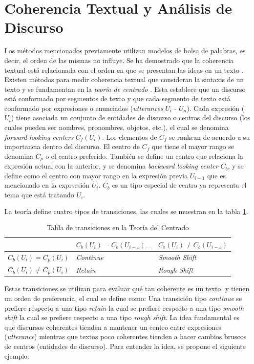 \documentclass[12pt]{diicc}
\begin{document}
\section{Coherencia Textual y Análisis de Discurso}
Los métodos mencionados previamente utilizan modelos de bolsa de palabras, es decir, el orden de las mismas no influye. Se ha demostrado que la coherencia textual está relacionada con el orden en que se presentan las ideas en un texto \cite{t33}. Existen métodos para medir coherencia textual que consideran la sintaxis de un texto \cite{t34} \cite{t35} y se fundamentan en la {\em teoría de centrado} \cite{t36}. Esta establece que un discurso está conformado por segmentos de texto y que cada segmento de texto está conformado por expresiones o enunciados ({\em utterances} $U_i$ - $U_n$). Cada expresión ($U_i$) tiene asociada un conjunto de entidades de discurso o centros del discurso (los cuales pueden ser nombres, pronombres, objetos, etc.), el cual se denomina {\em forward looking centers} $C_f(U_i)$. Los elementos de $C_f$ se rankean de acuerdo a su importancia dentro del discurso. El centro de $C_f$ que tiene el mayor rango se denomina $C_p$ o el centro preferido. También se define un centro que relaciona la expresión actual con la anterior, y se denomina {\em backward looking center} $C_b$, y se define como el centro con mayor rango en la expresión previa $U_{i-1}$ que es mencionado en la exprsesión $U_i$. $C_b$ es un tipo especial de centro ya representa el tema que está tratando $U_i$.

La teoría define cuatro tipos de transiciones, las cuales se muestran en la tabla \ref{t1}.

\begin{table}[!htbp]
\centering
\caption{Tabla de transiciones en la Teoría del Centrado}
\label{t1}
\begin{tabular}{lll}
\hline
\hline
                        & $C_b(U_i)=C_b(U_{i-1})$\_ & $C_b(U_i)\neq C_b(U_{i-1})$ \\
\hline
$C_b(U_i)=C_p(U_i)$     & {\em Continue}          & {\em Smooth Shift}        \\
$C_b(U_i)\neq C_p(U_i)$ & {\em Retain}            & {\em Rough Shift}         \\
\hline
\hline   
\end{tabular}
\end{table}

Estas transiciones se utilizan para evaluar qué tan coherente es un texto, y tienen un orden de preferencia, el cual se define como: Una transición tipo {\em continue} se prefiere respecto a una tipo {\em retain} la cual se prefiere respecto a una tipo {\em smooth shift} la cual se prefiere respecto a una tipo {\em rough shift}. La idea fundamental es que discursos coherentes tienden a mantener un centro entre expresiones ({\em utterance}) mientras que textos poco coherentes tienden a hacer cambios bruscos de centros (entidades de discurso). Para entender la idea, se propone el siguiente ejemplo:
\end{document}
